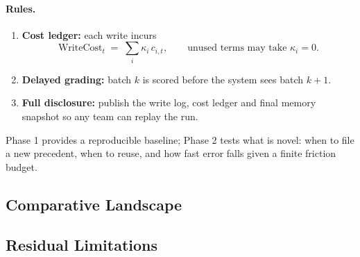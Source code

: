 \documentclass[11pt]{article}
\newcommand{\WriteCost}{\mathrm{WriteCost}}
\begin{document}
\paragraph{Rules.}
\begin{enumerate}\itemsep=2pt
\item \textbf{Cost ledger:} each write incurs
\[
\WriteCost_t \;=\; \sum_i \kappa_i\,c_{i,t},\qquad
\text{unused terms may take }\kappa_i=0.
\]
\item \textbf{Delayed grading:} batch \(k\) is scored before the system sees batch \(k{+}1\).
\item \textbf{Full disclosure:} publish the write log, cost ledger and final memory snapshot so any team can replay the run.
\end{enumerate}

Phase 1 provides a reproducible baseline; Phase 2 tests what is novel: when to
file a new precedent, when to reuse, and how fast error falls given a finite friction budget.

\subsection{\quad Comparative Landscape}

\begin{center}
\end{center}

\subsection{\quad Residual Limitations}
\label{sec:residual-limitations}
\end{document}

